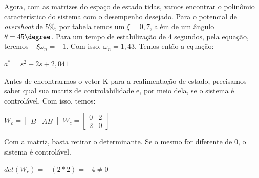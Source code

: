Agora, com as matrizes do espaço de estado tidas, vamos encontrar o polinômio característico do sistema com o desempenho desejado. Para o potencial de \textit{overshoot} de $5\%$, por tabela temos um $\xi = 0,7$, além de um ângulo $\theta = 45\degree$. Para um tempo de estabilização de 4 segundos, pela equação, teremos $-\xi \omega_n = -1$. Com isso, $\omega_n = 1,43$. Temos então a equação:
\begin{center}
    $a^* = s^2 + 2s + 2,041$
\end{center}

Antes de encontrarmos o vetor K para a realimentação de estado, precisamos saber qual sua matriz de controlabilidade e, por meio dela, se o sistema é controlável. Com isso, temos:
\begin{center}
    $W_c = \left[  \begin{array}{cc} B & AB \end{array} \right]$
    $W_c = \left[  \begin{array}{cc} 0 & 2\\ 2 & 0 \end{array} \right]$
\end{center}

Com a matriz, basta retirar o determinante. Se o mesmo for diferente de 0, o sistema é controlável.
\begin{center}
    $det(W_c) = -(2*2) = -4 \neq 0$
\end{center}

